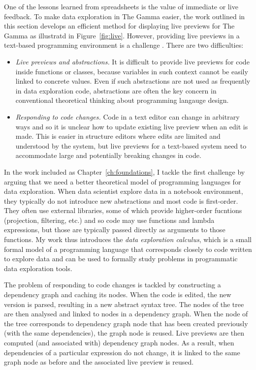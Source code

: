 \documentclass[fleqn,11pt]{report}
\theoremstyle{definition}
\newenvironment{nitemize}
{ \vspace{-0.4em}
  \begin{itemize}
    \setlength{\itemsep}{5pt}
    \setlength{\parskip}{0pt}
    \setlength{\parsep}{0pt} }
{ \end{itemize}
  \vspace{-0.4em} }
\begin{document}
One of the lessons learned from spreadsheets is the value of immediate or live feedback.
To make data exploration in The Gamma easier, the work outlined in this section develops an
efficient method for displaying live previews for The Gamma as illustratd in
Figure~\ref{fig:live}. However, providing live previews in a text-based programming environment
is a challenge \citep{mcdirmid-2007-live}. There are two difficulties:

\begin{nitemize}
\item \emph{Live previews and abstractions.} It is difficult to provide live previews for code
  inside functions or classes, because variables in such context cannot be easily linked to
  concrete values. Even if such abstractions are not used as frequently in data exploration code,
  abstractions are often the key concern in conventional theoretical thinking about programming
  langauge design.

\item \emph{Responding to code changes.} Code in a text editor can change in arbitrary ways and
  so it is unclear how to update existing live preview when an edit is made. This is easier in
  structure editors where edits are limited and understood by the system, but live previews for
  a text-based system need to accommodate large and potentially breaking changes in code.
\end{nitemize}

In the work included as Chapter~\ref{ch:foundations}, I tackle the first challenge by arguing that
we need a better theoretical model of programming languages for data exploration. When data
scientist explore data in a notebook environment, they typically do not introduce new abstractions
and most code is first-order. They often use external libraries, some of which provide higher-order
fucntions (projection, filtering, etc.) and so code may use functions and lambda expressions,
but those are typically passed directly as arguments to those functions. My work thus introduces
the \emph{data exploration calculus}, which is a small formal model of a programming language
that corresponds closely to code written to explore data and can be used to formally study
problems in programmatic data exploration tools.

The problem of responding to code changes is tackled by constructing a dependency graph and
caching its nodes. When the code is edited, the new version is parsed, resulting in a new
abstract syntax tree. The nodes of the tree are then analysed and linked to nodes in a
dependency graph. When the node of the tree corresponds to dependency graph node that has been
created previously (with the same dependencies), the graph node is reused. Live previews are
then computed (and associated with) dependency graph nodes. As a result, when dependencies of
a particular expression do not change, it is linked to the same graph node as before and the
associated live preview is reused.
\end{document}
